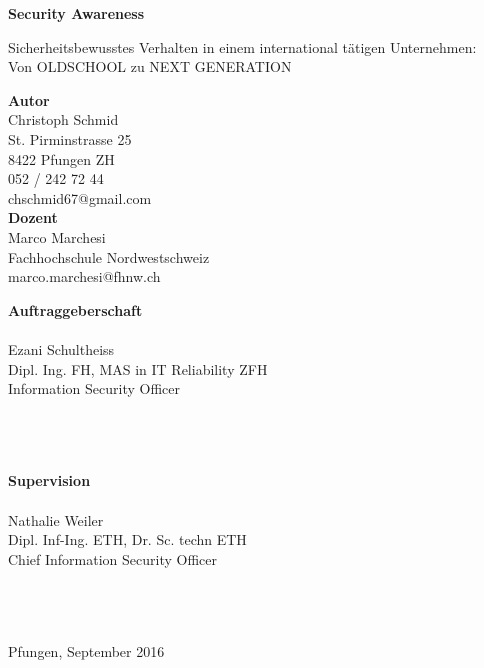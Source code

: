 \documentclass[../../main.tex]{subfiles}
\begin{document}
\vspace*{6cm}

\textbf{Security Awareness}

Sicherheitsbewusstes Verhalten in einem international tätigen Unternehmen: \\Von OLDSCHOOL zu NEXT GENERATION 
\vspace{1cm}

\textbf{Autor}\\
Christoph Schmid\\
St. Pirminstrasse 25\\
8422 Pfungen ZH\\
052 / 242 72 44\\
chschmid67@gmail.com\\


\textbf{Dozent}\\
Marco Marchesi\\
Fachhochschule Nordwestschweiz\\
marco.marchesi@fhnw.ch\\


\noindent
\begin{minipage}[H]{0.5\textwidth}
\textbf{Auftraggeberschaft}\\
\companylong\\
Ezani Schultheiss\\
Dipl. Ing. FH, MAS in IT Reliability ZFH\\
Information Security Officer\\
\companystreetmoz\\
\companycitymoz\\
\companyfonmoz\\
\companyemailmoz
\end{minipage}
\hfill
\begin{minipage}[H]{0.5\textwidth}
\textbf{Supervision}\\
\companylong\\
Nathalie Weiler\\
Dipl. Inf-Ing. ETH, Dr. Sc. techn ETH\\
Chief Information Security Officer\\
\companystreetnawe\\
\companycitynawe\\
\companyfonnawe\\
\companyemailnawe
\end{minipage}

\vspace{1cm}

Pfungen, September 2016
\end{document}
